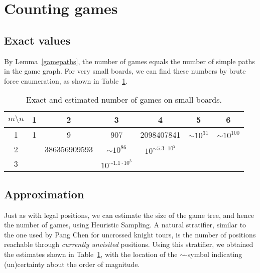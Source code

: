 \documentclass{article}
\begin{document}
\section{Counting games}
\subsection{Exact values}
By Lemma~\ref{gamepaths}, the number of games equals the number of simple
paths in the game graph. For very small boards, we can find these
numbers by brute force enumeration, as shown in Table~\ref{numberofgames}.

\begin{table}
\begin{center}
\begin{tabular}{|c||c|c|c|c|c|c|}
\hline
$m \setminus n$ & 1 & 2 & 3 & 4 & 5 & 6 \\ \hline
1 & 1 & 9 & 907 & 2098407841 & $\sim 10^{31}$ & $\sim 10^{100}$ \\
2 & & 386356909593 & $\sim 10^{86}$ & $10^{\sim 5.3\cdot 10^2}$ & & \\
3 & & & $10^{\sim 1.1\cdot 10^3}$ & & & \\
\hline
\end{tabular}
\end{center}
\caption{Exact and estimated number of games on small boards.}
\label{numberofgames}
\end{table}

\subsection{Approximation}
Just as with legal positions, we can estimate the size of the game tree,
and hence the number of games, using Heuristic Sampling.
A natural stratifier,
similar to the one used by Pang Chen for uncrossed knight tours,
is the number of positions reachable through {\em currently unvisited}
positions.  Using this stratifier, we obtained the
estimates shown in Table~\ref{numberofgames}, with the location of the
$\sim$-symbol indicating (un)certainty about the order of magnitude.
\end{document}
